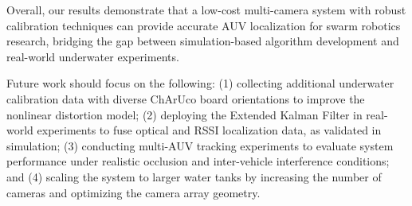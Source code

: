\documentclass[11pt]{article}
\begin{document}
Overall, our results demonstrate that a low-cost multi-camera system with robust calibration techniques can provide accurate AUV localization for swarm robotics research, bridging the gap between simulation-based algorithm development and real-world underwater experiments.

Future work should focus on the following: (1) collecting additional underwater calibration data with diverse ChArUco board orientations to improve the nonlinear distortion model; (2) deploying the Extended Kalman Filter in real-world experiments to fuse optical and RSSI localization data, as validated in simulation; (3) conducting multi-AUV tracking experiments to evaluate system performance under realistic occlusion and inter-vehicle interference conditions; and (4) scaling the system to larger water tanks by increasing the number of cameras and optimizing the camera array geometry.

\newpage
{}
    
    
\end{document}
